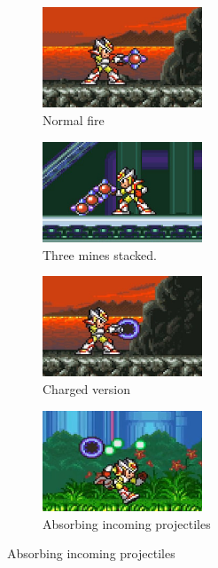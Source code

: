 \begin{figure}[htp]
	\centering
	\begin{subfigure}{0.4\linewidth}
		\centering
		\includegraphics[height=3cm]{figures/X2/weapons/M_mine_1.png}	
		\caption{Normal fire}
	\end{subfigure}
	\begin{subfigure}{0.4\linewidth}
		\centering
		\includegraphics[height=3cm]{figures/X2/weapons/M_mine_2.png}	
		\caption{Three mines stacked.}
	\end{subfigure}
	\begin{subfigure}{0.4\linewidth}
		\centering
		\includegraphics[height=3cm]{figures/X2/weapons/M_mine_3.png}	
		\caption{Charged version}
	\end{subfigure}
	\begin{subfigure}{0.4\linewidth}
		\centering
		\includegraphics[height=3cm]{figures/X2/weapons/M_mine_4.png}	
		\caption{Absorbing incoming projectiles}
	\end{subfigure}
\end{figure}
